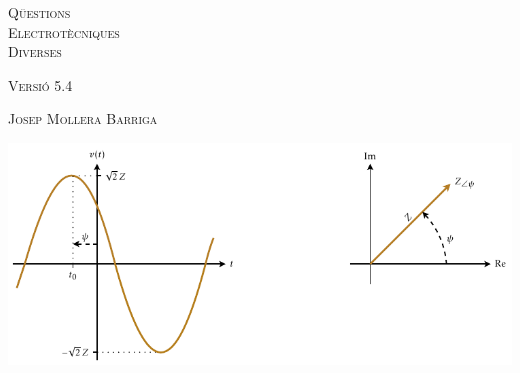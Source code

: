 \begin{titlepage}

   \parbox{18cm}{\fontsize{60pt}{60pt}\selectfont\color{NavyBlue}\scshape%
                 Q\"{u}estions\\[30pt] Electrot\`{e}cniques\\[30pt] Diverses}

   \vspace*{1.8cm}
   {\fontsize{30pt}{30pt}\selectfont\textsc{Versi\'{o} 5.4}}

   \vspace*{2cm}
   {\fontsize{40pt}{40pt}\selectfont\textsc{Josep Mollera Barriga}}

   \vspace*{1.5cm}
   \includegraphics[scale=1.3]{Imatges/Not-Fasor.pdf}

\end{titlepage}
